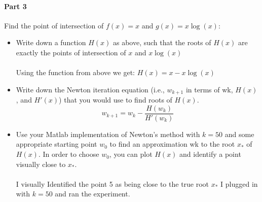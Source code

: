 \documentclass{article}
\begin{document}
\paragraph{Part 3}
Find the point of intersection of $f(x) = x$ and $g(x) = x \log(x)$:
\begin{itemize}
  \item Write down a function $H(x)$ as above, such that the roots of $H(x)$ are exactly the points of intersection of $x$ and $x \log(x)$
  \paragraph{}
  Using the function from above we get: $H(x) = x - x \log(x)$
  \item Write down the Newton iteration equation (i.e., $w_{k+1}$ in terms of wk, $H(x)$, and $H'(x)$) that you would use to find roots of $H(x)$.
  \[w_{k+1} = w_k - \frac{H(w_k)}{H'(w_k)}\]
  
  \item Use your Matlab implementation of Newton’s method with $k = 50$ and some appropriate starting point $w_0$ to find an approximation wk to the root $x_*$ of $H(x)$. In order to choose $w_0$, you can plot $H(x)$ and identify a point visually close to $x_*$.
  \paragraph{}
  I visually Identified the point 5 as being close to the true root $x_*$ I plugged in with $k=50$ and ran the experiment.
  
\end{itemize}
\end{document}
